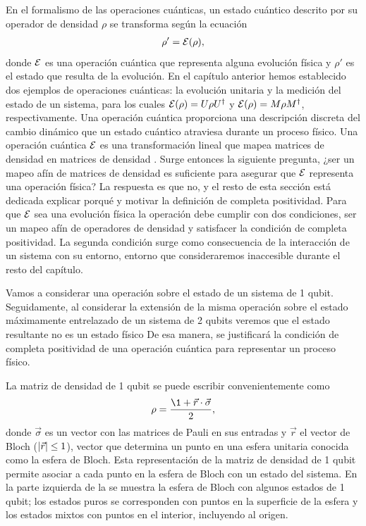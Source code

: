 En el formalismo de las operaciones cuánticas, un estado cuántico
descrito por su operador de densidad $\rho$
se transforma según la ecuación \cite{nielsen_chuang_2011}
\begin{align}
\rho' = \mathcal{E} (\rho)
\label{eq:E(rho)},
\end{align} 
donde $\mathcal{E}$ es una operación cuántica que representa alguna evolución 
física y $\rho'$ es el estado que resulta de la evolución. 
En el capítulo anterior hemos 
establecido dos ejemplos de operaciones cuánticas: la evolución unitaria 
y la medición del estado de un sistema, 
para los cuales $\mathcal{E} \qty(\rho)=U\rho U^{\dagger}$ y 
$\mathcal{E}(\rho)=M\rho M^{\dagger}$, respectivamente. 
Una operación cuántica proporciona
una descripción discreta del cambio dinámico que un estado cuántico 
atraviesa durante un proceso físico. Una operación cuántica $\mathcal{E}$ es
una transformación lineal que mapea matrices de densidad en matrices 
de densidad \cite{bengtsson_zyczkowski_2017}. Surge entonces la siguiente
pregunta, ¿ser un mapeo afín de matrices de densidad es
suficiente para asegurar que $\mathcal{E}$ representa una operación física? 
La respuesta es que no, y el resto de esta sección está dedicada
explicar porqué y motivar la definición de completa positividad.  
Para que $\mathcal{E}$ sea una evolución física la operación debe cumplir con dos
condiciones, ser un mapeo afín de operadores de densidad 
y satisfacer la condición de completa positividad. La segunda condición
surge como consecuencia de la interacción de un sistema 
con su entorno, entorno que consideraremos inaccesible durante
el resto del capítulo.


Vamos a considerar una operación sobre el estado de un sistema de 
1 qubit. Seguidamente, al considerar la extensión de la misma operación
sobre el estado máximamente entrelazado de un sistema de 2 qubits 
veremos que el estado resultante no es un estado físico
De esa manera, se justificará la condición de completa positividad 
de una operación cuántica para representar un proceso físico.

La matriz de densidad de 1 qubit se puede escribir convenientemente
como \cite{nielsen_chuang_2011}
\begin{align}
\rho=\frac{\1+\vec{r}\cdot\vec{\sigma}}{2},
\label{eq:DM-1q}
\end{align}
donde $\vec{\sigma}$ es un vector con las matrices de Pauli 
en sus entradas y $\vec{r}$
el vector de Bloch ($\abs{\vec{r}}\leq1$), vector que determina
un punto en una esfera unitaria conocida como la esfera de Bloch. 
Esta representación de la matriz de densidad de 1 qubit 
permite asociar a cada punto en la 
esfera de Bloch con un estado del sistema. En la parte
izquierda de la  se muestra la esfera de Bloch
con algunos estados de 1 qubit; los estados puros se corresponden
con puntos en la superficie de la esfera y los estados mixtos 
con puntos en el interior, incluyendo al origen.

